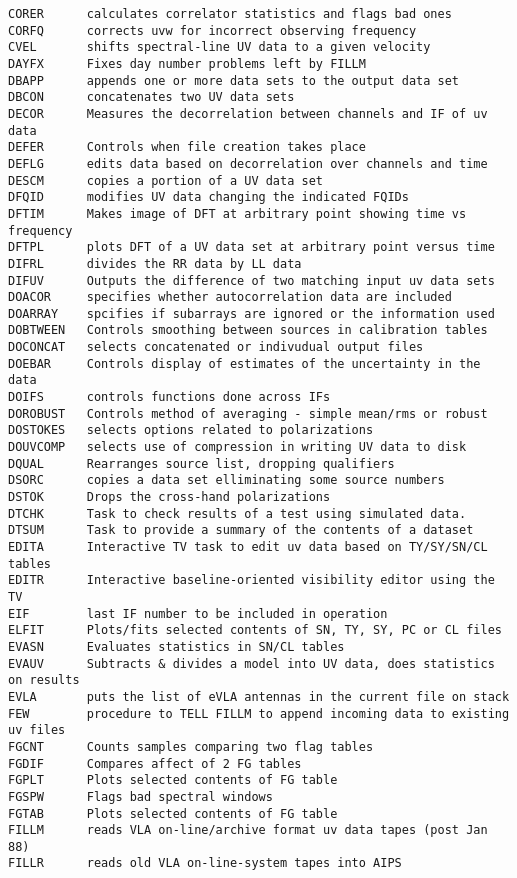 \begin{verbatim}
CORER      calculates correlator statistics and flags bad ones
CORFQ      corrects uvw for incorrect observing frequency
CVEL       shifts spectral-line UV data to a given velocity
DAYFX      Fixes day number problems left by FILLM
DBAPP      appends one or more data sets to the output data set
DBCON      concatenates two UV data sets
DECOR      Measures the decorrelation between channels and IF of uv data
DEFER      Controls when file creation takes place
DEFLG      edits data based on decorrelation over channels and time
DESCM      copies a portion of a UV data set
DFQID      modifies UV data changing the indicated FQIDs
DFTIM      Makes image of DFT at arbitrary point showing time vs frequency
DFTPL      plots DFT of a UV data set at arbitrary point versus time
DIFRL      divides the RR data by LL data
DIFUV      Outputs the difference of two matching input uv data sets
DOACOR     specifies whether autocorrelation data are included
DOARRAY    spcifies if subarrays are ignored or the information used
DOBTWEEN   Controls smoothing between sources in calibration tables
DOCONCAT   selects concatenated or indivudual output files
DOEBAR     Controls display of estimates of the uncertainty in the data
DOIFS      controls functions done across IFs
DOROBUST   Controls method of averaging - simple mean/rms or robust
DOSTOKES   selects options related to polarizations
DOUVCOMP   selects use of compression in writing UV data to disk
DQUAL      Rearranges source list, dropping qualifiers
DSORC      copies a data set elliminating some source numbers
DSTOK      Drops the cross-hand polarizations
DTCHK      Task to check results of a test using simulated data.
DTSUM      Task to provide a summary of the contents of a dataset
EDITA      Interactive TV task to edit uv data based on TY/SY/SN/CL tables
EDITR      Interactive baseline-oriented visibility editor using the TV
EIF        last IF number to be included in operation
ELFIT      Plots/fits selected contents of SN, TY, SY, PC or CL files
EVASN      Evaluates statistics in SN/CL tables
EVAUV      Subtracts & divides a model into UV data, does statistics on results
EVLA       puts the list of eVLA antennas in the current file on stack
FEW        procedure to TELL FILLM to append incoming data to existing uv files
FGCNT      Counts samples comparing two flag tables
FGDIF      Compares affect of 2 FG tables
FGPLT      Plots selected contents of FG table
FGSPW      Flags bad spectral windows
FGTAB      Plots selected contents of FG table
FILLM      reads VLA on-line/archive format uv data tapes (post Jan 88)
FILLR      reads old VLA on-line-system tapes into AIPS

\end{verbatim}
